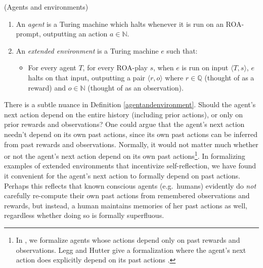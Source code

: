 \documentclass[runningheads]{llncs}
\begin{document}
\begin{definition}
\label{agentandenvironment}
(Agents and environments)
    \begin{enumerate}
    \item An \emph{agent} is a Turing machine which
    halts whenever it is run on an ROA-prompt, outputting
    an action $a\in\mathbb N$.
    \item An \emph{extended environment} is a Turing machine $e$ such that:
        \begin{itemize}
            \item
            For every agent $T$, for every
            ROA-play $s$,
            when $e$ is run on input $\langle T,s\rangle$, $e$ halts on that input,
            outputting a pair $\langle r,o\rangle$ where $r\in\mathbb Q$ (thought of
            as a reward) and $o\in\mathbb N$ (thought of as an observation).
        \end{itemize}
    \end{enumerate}
\end{definition}

There is a subtle nuance in Definition \ref{agentandenvironment}. Should the agent's
next action depend on the entire history (including prior actions), or only on prior
rewards and observations? One could argue that
the agent's next action needn't depend on its own past actions, since its own past actions
can be inferred from past rewards and observations.
Normally, it would not matter much whether
or not the agent's next action depend on its own past actions\footnote{In
\cite{alexander2019intelligence}, we
formalize agents whose actions depend only on past rewards and observations.
Legg and Hutter give a formalization where the agent's next action does explicitly
depend on its past actions \cite{legg2007universal}.}. In formalizing examples of extended
environments that incentivize self-reflection, we have found it convenient for the agent's
next action to formally depend on past actions. Perhaps this reflects that known
conscious agents (e.g.\ humans)
evidently do \emph{not} carefully re-compute their own
past actions from remembered observations and rewards, but instead, a human maintains
memories of her past actions as well, regardless whether doing so is formally superfluous.
\end{document}
